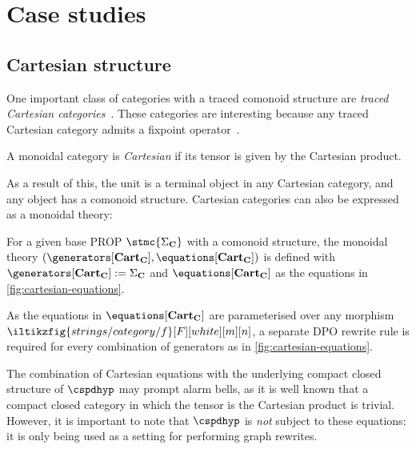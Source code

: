 \section{Case studies}

\subsection{Cartesian structure}

One important class of categories with a traced comonoid structure are
\emph{traced Cartesian categories}~\cite{cazanescu1990new,hasegawa1997recursion}.
These categories are interesting because any traced Cartesian
category admits a fixpoint operator~\cite[Thm. 3.1]{hasegawa1997recursion}.

\begin{definition}
    A monoidal category is \emph{Cartesian} if its tensor is given by the
    Cartesian product.
\end{definition}

As a result of this, the unit is a terminal object in any Cartesian category,
and any object has a comonoid structure.
Cartesian categories can also be expressed as a monoidal theory:

\begin{definition}
    For a given base PROP \(\stmc{\Sigma_\mathbf{C}}\) with a comonoid
    structure, the monoidal theory \((
        \generators[\mathbf{Cart}_\mathbf{C}],
        \equations[\mathbf{Cart}_\mathbf{C}]
    )\) is defined with \(
        \generators[\mathbf{Cart}_\mathbf{C}] := \Sigma_\mathbf{C}
    \) and \(
        \equations[\mathbf{Cart}_\mathbf{C}]
    \) as the equations in \cref{fig:cartesian-equations}.
\end{definition}

As the equations in \(\equations[\mathbf{Cart}_\mathbf{C}]\) are parameterised
over any morphism \(\iltikzfig{strings/category/f}[F][white][m][n]\), a separate
DPO rewrite rule is required for every combination of generators as in
\cref{fig:cartesian-equations}.

\begin{remark}
    The combination of Cartesian equations with the underlying compact closed
    structure of \(\cspdhyp\) may prompt alarm bells, as it is well known that
    a compact closed category in which the tensor is the Cartesian product is
    trivial.
    However, it is important to note that \(\cspdhyp\) is \emph{not} subject to
    these equations: it is only being used as a setting for performing graph
    rewrites.
\end{remark}

